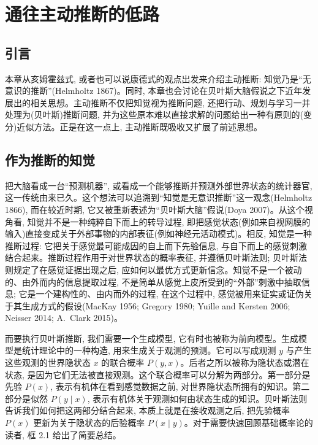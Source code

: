 \chapter{通往主动推断的低路}

\section{引言}

本章从亥姆霍兹式, 或者也可以说康德式的观点出发来介绍主动推断: 知觉乃是``无意识的推断''(Helmholtz 1867)。同时, 本章也会讨论在贝叶斯大脑假说之下近年发展出的相关思想。主动推断不仅把知觉视为推断问题, 还把行动、规划与学习一并处理为(贝叶斯)推断问题, 并为这些原本难以直接求解的问题给出一种有原则的(变分)近似方法。正是在这一点上, 主动推断既吸收又扩展了前述思想。

\section{作为推断的知觉}

把大脑看成一台``预测机器'', 或看成一个能够推断并预测外部世界状态的统计器官, 这一传统由来已久。这个想法可以追溯到``知觉是无意识推断''这一观念(Helmholtz 1866), 而在较近时期, 它又被重新表述为``贝叶斯大脑''假说(Doya 2007)。从这个视角看, 知觉并不是一种纯粹自下而上的转导过程, 即把感觉状态(例如来自视网膜的输入)直接变成关于外部事物的内部表征(例如神经元活动模式)。相反, 知觉是一种推断过程: 它把关于感觉最可能成因的自上而下先验信息, 与自下而上的感觉刺激结合起来。推断过程作用于对世界状态的概率表征, 并遵循贝叶斯法则; 贝叶斯法则规定了在感觉证据出现之后, 应如何以最优方式更新信念。知觉不是一个被动的、由外而内的信息提取过程, 不是简单从感觉上皮所受到的``外部''刺激中抽取信息; 它是一个建构性的、由内而外的过程, 在这个过程中, 感觉被用来证实或证伪关于其生成方式的假设(MacKay 1956; Gregory 1980; Yuille and Kersten 2006; Neisser 2014; A.~Clark 2015)。

而要执行贝叶斯推断, 我们需要一个生成模型, 它有时也被称为前向模型。生成模型是统计理论中的一种构造, 用来生成关于观测的预测。它可以写成观测 $y$ 与产生这些观测的世界隐状态 $x$ 的联合概率 $P(y, x)$。后者之所以被称为隐状态或潜在状态, 是因为它们无法被直接观测。这个联合概率可以分解为两部分。第一部分是先验 $P(x)$, 表示有机体在看到感觉数据之前, 对世界隐状态所拥有的知识。第二部分是似然 $P(y \mid x)$, 表示有机体关于观测如何由状态生成的知识。贝叶斯法则告诉我们如何把这两部分结合起来, 本质上就是在接收观测之后, 把先验概率 $P(x)$ 更新为关于隐状态的后验概率 $P(x \mid y)$。对于需要快速回顾基础概率论的读者, 框 2.1 给出了简要总结。

